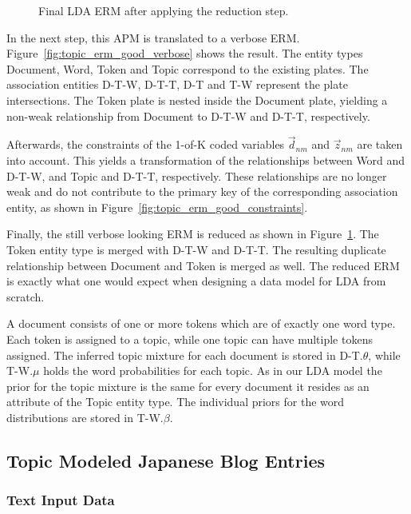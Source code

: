 \begin{figure}[p]
\centering
\scalebox{0.5}{\adjustTikzSize }
\caption[Final LDA ERM after applying the reduction step]{Final LDA ERM after applying the reduction step.}\label{fig:topic_erm_good_reduced}
\end{figure}

In the next step, this APM is translated to a verbose ERM. Figure~\ref{fig:topic_erm_good_verbose} shows the result. The entity types Document, Word, Token and Topic correspond to the existing plates. The association entities D-T-W, D-T-T, D-T and T-W represent the plate intersections. The Token plate is nested inside the Document plate, yielding a non-weak relationship from Document to D-T-W and D-T-T, respectively.

Afterwards, the constraints of the 1-of-K coded variables $\vec d_{nm}$ and $\vec z_{nm}$ are taken into account. This yields a transformation of the relationships between Word and D-T-W, and Topic and D-T-T, respectively. These relationships are no longer weak and do not contribute to the primary key of the corresponding association entity, as shown in Figure~\ref{fig:topic_erm_good_constraints}.

Finally, the still verbose looking ERM is reduced as shown in Figure~\ref{fig:topic_erm_good_reduced}. The Token entity type is merged with D-T-W and D-T-T. The resulting duplicate relationship between Document and Token is merged as well. The reduced ERM is exactly what one would expect when designing a data model for LDA from scratch.

A document consists of one or more tokens which are of exactly one word type. Each token is assigned to a topic, while one topic can have multiple tokens assigned. The inferred topic mixture for each document is stored in D-T.$\theta$, while T-W.$\mu$ holds the word probabilities for each topic. As in our LDA model the prior for the topic mixture is the same for every document it resides as an attribute of the Topic entity type. The individual priors for the word distributions are stored in T-W.$\beta$.

\subsection{Topic Modeled Japanese Blog Entries}

\subsubsection{Text Input Data}

